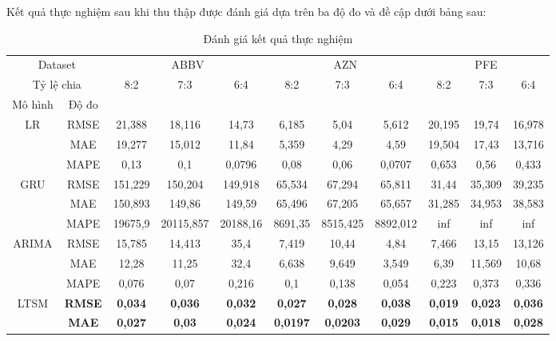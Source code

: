 \documentclass[conference]{IEEEtran}
\begin{document}
Kết quả thực nghiệm sau khi thu thập được đánh giá dựa trên ba độ đo và đề cập dưới bảng sau:
\begin{table}[H]
    \centering
    \caption{Đánh giá kết quả thực nghiệm}
    \renewcommand{\arraystretch}{2}
    \tiny
    \begin{adjustbox}{width=0.5\textwidth}
    \begin{tabular}{|c|c|c|c|c|c|c|c|c|c|c|} \hline
          \multicolumn{2}{|c|}{Dataset} & \multicolumn{3}{c|}{ABBV} & \multicolumn{3}{c|}{AZN} & \multicolumn{3}{c|}{PFE} \\ \cline{1-11}
          \multicolumn{2}{|c|}{Tỷ lệ chia} & 8:2 & 7:3 & 6:4 & 8:2 & 7:3 & 6:4 & 8:2 & 7:3 & 6:4 \\ \hline
         Mô hình & Độ đo & & & & & & & & & \\ \hline
         \multirow{3}{*}{LR} & RMSE & 21,388 & 18,116 & 14,73 & 6,185 & 5,04 & 5,612 & 20,195 & 19,74 & 16,978 \\ \cline{2-11}
         & MAE & 19,277 & 15,012 & 11,84 & 5,359 & 4,29 & 4,59 & 19,504 & 17,43 & 13,716 \\ \cline{2-11}
         & MAPE & 0,13 & 0,1 & 0,0796 & 0,08 & 0,06 & 0,0707 & 0,653 & 0,56 & 0,433 \\ \cline{2-11} \hline
         \multirow{3}{*}{GRU} & RMSE & 151,229 & 150,204 & 149,918 & 65,534 & 67,294 & 65,811 & 31,44 & 35,309 & 39,235 \\ \cline{2-11}
         & MAE & 150,893 & 149,86 & 149,59 & 65,496 & 67,205 & 65,657 & 31,285 & 34,953 & 38,583 \\ \cline{2-11}
         & MAPE & 19675,9 & 20115,857 & 20188,16 & 8691,35 & 8515,425 & 8892,012 & inf & inf & inf \\ \cline{2-11} \hline
         \multirow{3}{*}{ARIMA} & RMSE & 15,785 & 14,413 & 35,4 & 7,419 & 10,44 & 4,84 & 7,466 & 13,15 & 13,126 \\ \cline{2-11}
         & MAE & 12,28 & 11,25 & 32,4 & 6,638 & 9,649 & 3,549 & 6,39 & 11,569 & 10,68 \\ \cline{2-11}
         & MAPE & 0,076 & 0,07 & 0,216 & 0,1 & 0,138 & 0,054 & 0,223 & 0,373 & 0,336 \\ \cline{2-11} \hline
         \multirow{3}{*}{LTSM} & \textbf{RMSE} & \textbf{0,034} & \textbf{0,036} & \textbf{0,032} & \textbf{0,027} & \textbf{0,028} & \textbf{0,038} & \textbf{0,019} & \textbf{0,023} & \textbf{0,036} \\ \cline{2-11}
         & \textbf{MAE} & \textbf{0,027} & \textbf{0,03} & \textbf{0,024} & \textbf{0,0197} & \textbf{0,0203} & \textbf{0,029} & \textbf{0,015} & \textbf{0,018} & \textbf{0,028} \\ \cline{2-11}

\end{tabular}
\end{adjustbox}
\end{table}
\end{document}
